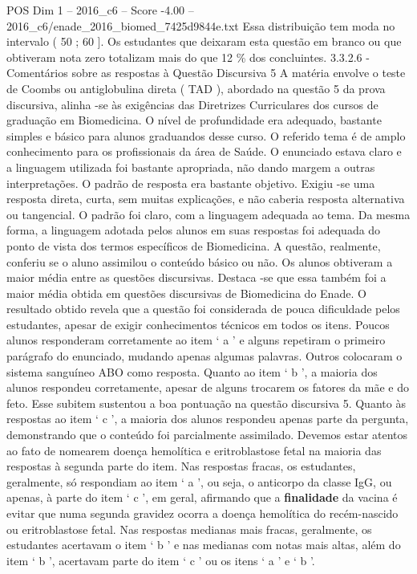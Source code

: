 \begin{textsample}{POS Dim 1 – 2016\_c6 – Score -4.00 – 2016\_c6/enade\_2016\_biomed\_7425d9844e.txt}
Essa distribuição tem moda no intervalo ( 50 ; 60 ].
Os estudantes que deixaram esta questão em branco ou que obtiveram nota zero totalizam mais do que 12 \% dos concluintes. 3.3.2.6 - Comentários sobre as respostas à Questão Discursiva 5 A matéria envolve o teste de Coombs ou antiglobulina direta ( TAD ), abordado na questão 5 da prova discursiva, alinha -se às exigências das Diretrizes Curriculares dos cursos de graduação em Biomedicina.
O nível de profundidade era adequado, bastante simples e básico para alunos graduandos desse curso.
O referido tema é de amplo conhecimento para os profissionais da área de Saúde.
O enunciado estava claro e a linguagem utilizada foi bastante apropriada, não dando margem a outras interpretações.
O padrão de resposta era bastante objetivo.
Exigiu -se uma resposta direta, curta, sem muitas explicações, e não caberia resposta alternativa ou tangencial.
O padrão foi claro, com a linguagem adequada ao tema.
Da mesma forma, a linguagem adotada pelos alunos em suas respostas foi adequada do ponto de vista dos termos específicos de Biomedicina.
A questão, realmente, conferiu se o aluno assimilou o conteúdo básico ou não.
Os alunos obtiveram a maior média entre as questões discursivas.
Destaca -se que essa também foi a maior média obtida em questões discursivas de Biomedicina do Enade.
O resultado obtido revela que a questão foi considerada de pouca dificuldade pelos estudantes, apesar de exigir conhecimentos técnicos em todos os itens.
Poucos alunos responderam corretamente ao item ‘ a ’ e alguns repetiram o primeiro parágrafo do enunciado, mudando apenas algumas palavras.
Outros colocaram o sistema sanguíneo ABO como resposta.
Quanto ao item ‘ b ’, a maioria dos alunos respondeu corretamente, apesar de alguns trocarem os fatores da mãe e do feto.
Esse subitem sustentou a boa pontuação na questão discursiva 5.
Quanto às respostas ao item ‘ c ’, a maioria dos alunos respondeu apenas parte da pergunta, demonstrando que o conteúdo foi parcialmente assimilado.
Devemos estar atentos ao fato de nomearem doença hemolítica e eritroblastose fetal na maioria das respostas à segunda parte do item.
Nas respostas fracas, os estudantes, geralmente, só respondiam ao item ‘ a ’, ou seja, o anticorpo da classe IgG, ou apenas, à parte do item ‘ c ’, em geral, afirmando que a \textbf{finalidade} da vacina é evitar que numa segunda gravidez ocorra a doença hemolítica do recém-nascido ou eritroblastose fetal.
Nas respostas medianas mais fracas, geralmente, os estudantes acertavam o item ‘ b ’ e nas medianas com notas mais altas, além do item ‘ b ’, acertavam parte do item ‘ c ’ ou os itens ‘ a ’ e ‘ b ’.

\end{textsample}
